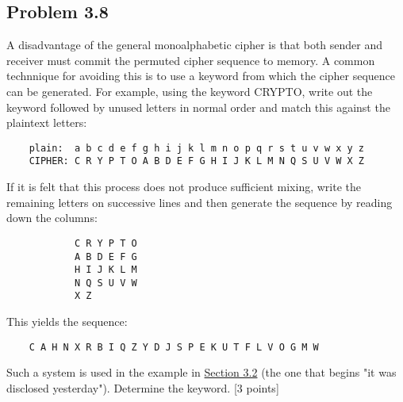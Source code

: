 \documentclass[../hw_sols.tex]{subfiles}
\begin{document}
\subsection*{Problem 3.8}

A disadvantage of the general monoalphabetic cipher is that both sender and 
receiver must commit the permuted cipher sequence to memory. A common 
technnique for avoiding this is to use a keyword from which the cipher 
sequence can be generated. For example, using the keyword CRYPTO, write out 
the keyword followed by unused letters in normal order and match this against 
the plaintext letters:
\begin{verbatim}
    plain:  a b c d e f g h i j k l m n o p q r s t u v w x y z
    CIPHER: C R Y P T O A B D E F G H I J K L M N Q S U V W X Z
\end{verbatim}

\noindent If it is felt that this process does not produce sufficient mixing, 
write the remaining letters on successive lines and then generate the sequence 
by reading down the columns:
\begin{verbatim}
            C R Y P T O
            A B D E F G
            H I J K L M
            N Q S U V W
            X Z
\end{verbatim}

\noindent This yields the sequence:
\begin{verbatim}
    C A H N X R B I Q Z Y D J S P E K U T F L V O G M W
\end{verbatim}

\noindent Such a system is used in the example in 
\href{run:../Cryptography and Network Security.pdf}{Section 3.2} (the one that 
begins "it was disclosed yesterday"). Determine the keyword. [3 points]
\end{document}
